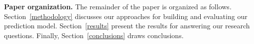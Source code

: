 \textbf{Paper organization.}
The remainder of the paper is organized as follows.
Section~\ref{methodology} discusses our approaches for building and evaluating our prediction model. %
Section~\ref{results} present the results for answering our research questions.
Finally, Section~\ref{conclusions} draws conclusions.

